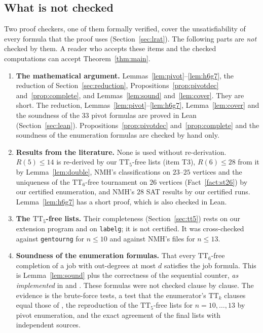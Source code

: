 \documentclass[11pt]{amsart}
\theoremstyle{definition}
\theoremstyle{remark}
\newcommand{\TT}[1]{\mathrm{TT}_{#1}}
\begin{document}
\subsection{What is not checked}
Two proof checkers, one of them formally verified, cover the unsatisfiability
of every formula that the proof uses (Section~\ref{sec:lrat}). The following
parts are \emph{not} checked by them. A reader who accepts these items and the
checked computations can accept Theorem~\ref{thm:main}.

\begin{enumerate}[label=\textbf{T\arabic*.},leftmargin=*]
\item \textbf{The mathematical argument.} Lemmas~\ref{lem:pivot}--\ref{lem:h6g7},
  the reduction of Section~\ref{sec:reduction},
  Propositions~\ref{prop:pivotdec} and~\ref{prop:complete}, and
  Lemmas~\ref{lem:sound} and~\ref{lem:cover}. They are short. The reduction,
  Lemmas~\ref{lem:pivot}--\ref{lem:h6g7}, Lemma~\ref{lem:cover} and the
  soundness of the $33$ pivot formulas are proved in Lean
  (Section~\ref{sec:lean}). Propositions~\ref{prop:pivotdec}
  and~\ref{prop:complete} and the soundness of the enumeration formulas are
  checked by hand only.

\item \textbf{Results from the literature.} None is used without
  re-derivation. $R(5) \le 14$ is re-derived by our $\TT{5}$-free lists (item
  T3), $R(6) \le 28$ from it by Lemma~\ref{lem:double}, NMH's classifications
  on $23$--$25$ vertices and the uniqueness of the $\TT{6}$-free tournament on
  $26$ vertices (Fact~\ref{fact:st26}) by our certified enumeration, and NMH's
  $28$ SAT results by our certified runs. Lemma~\ref{lem:h6g7} has a short
  proof, which is also checked in Lean.

\item \textbf{The $\TT{5}$-free lists.} Their completeness (Section~\ref{sec:tt5})
  rests on our extension program and on \texttt{labelg}; it is not certified.
  It was cross-checked against \texttt{gentourng} for $n\le 10$ and against
  NMH's files for $n \le 13$.

\item \textbf{Soundness of the enumeration formulas.} That every
  $\TT{6}$-free completion of a job with out-degrees at most $d$ satisfies the
  job formula. This is Lemma~\ref{lem:sound} plus the correctness of the
  sequential counter, \emph{as implemented} in  and
  . These formulas were not checked clause by clause.
  The evidence is the brute-force tests, a test that the enumerator's
  $\TT{k}$ clauses equal those of , the reproduction of the
  $\TT{5}$-free lists for $n=10,\dots,13$ by pivot enumeration, and the exact
  agreement of the final lists with independent sources.


\end{enumerate}
\end{document}
